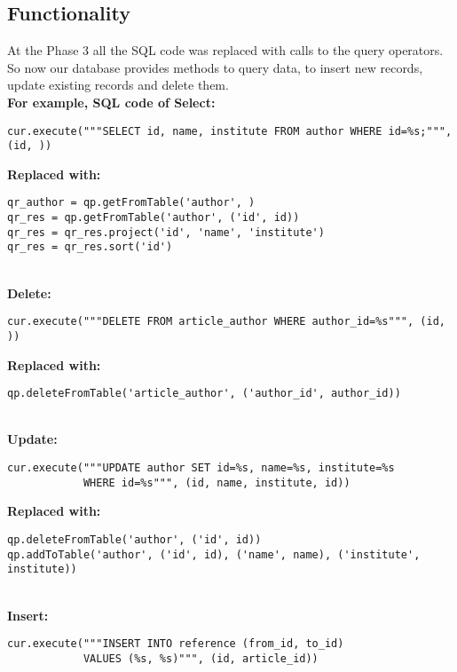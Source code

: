 \documentclass{article}
\begin{document}
\subsection{Functionality}
At the Phase 3 all the SQL code was replaced with calls to the query operators. So now our database provides methods to query data, to insert new records, update existing records and delete them. \\

\textbf{For example, SQL code of Select:}

\begin{verbatim}
cur.execute("""SELECT id, name, institute FROM author WHERE id=%s;""", (id, ))
\end{verbatim}

\textbf{Replaced with:}

\begin{verbatim}
qr_author = qp.getFromTable('author', )
qr_res = qp.getFromTable('author', ('id', id))
qr_res = qr_res.project('id', 'name', 'institute')
qr_res = qr_res.sort('id')
\end{verbatim}
~
\\
\textbf{Delete:}

\begin{verbatim}
cur.execute("""DELETE FROM article_author WHERE author_id=%s""", (id, ))
\end{verbatim}

\textbf{Replaced with:}

\begin{verbatim}
qp.deleteFromTable('article_author', ('author_id', author_id))
\end{verbatim}
~
\\
\textbf{Update:}

\begin{verbatim}
cur.execute("""UPDATE author SET id=%s, name=%s, institute=%s
            WHERE id=%s""", (id, name, institute, id))
\end{verbatim}

\textbf{Replaced with:}

\begin{verbatim}
qp.deleteFromTable('author', ('id', id))
qp.addToTable('author', ('id', id), ('name', name), ('institute', institute))
\end{verbatim}
~
\\
\textbf{Insert:}
\begin{verbatim}
cur.execute("""INSERT INTO reference (from_id, to_id)
            VALUES (%s, %s)""", (id, article_id))
\end{verbatim}
\end{document}
